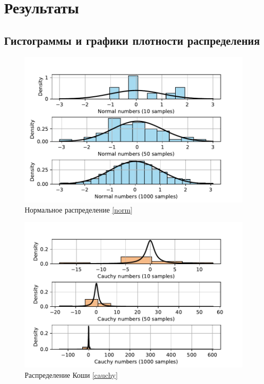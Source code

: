 \documentclass[a4paper]{article}
\begin{document}
\section{Результаты}
\subsection{Гистограммы и графики плотности распределения}
\begin{figure}[H]
    \centering
    \includegraphics[width = 16 cm]{sources/normalNumbers.pdf}
    \caption{Нормальное распределение \eqref{norm}}
    \label{fig:norm}
\end{figure}
\begin{figure}[H]
    \centering
    \includegraphics[width = 16 cm]{sources/cauchyNumbers.pdf}
    \caption{Распределение Коши \eqref{cauchy}}
    \label{fig:cauchy}
\end{figure}
\end{document}
